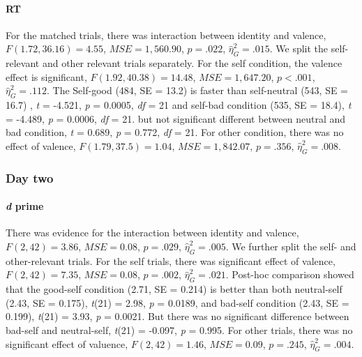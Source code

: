 \documentclass[man]{apa6}
\let\oldparagraph\paragraph
\renewcommand{\paragraph}[1]{\oldparagraph{#1}\mbox{}}
\begin{document}
\hypertarget{rt}{%
\paragraph{RT}\label{rt}}

For the matched trials, there was interaction between identity and valence, \(F(1.72, 36.16) = 4.55\), \(\mathit{MSE} = 1,560.90\), \(p = .022\), \(\hat{\eta}^2_G = .015\). We split the self-relevant and other relevant trials separately. For the self condition, the valence effect is significant, \(F(1.92, 40.38) = 14.48\), \(\mathit{MSE} = 1,647.20\), \(p < .001\), \(\hat{\eta}^2_G = .112\). The Self-good (484, SE = 13.2) is faster than self-neutral (543, SE = 16.7) , \emph{t} = -4.521, \emph{p} = 0.0005, \emph{df} = 21 and self-bad condition (535, SE = 18.4), \emph{t} = -4.489, \emph{p} = 0.0006, \emph{df} = 21. but not significant different between neutral and bad condition, \emph{t} = 0.689, \emph{p} = 0.772, \emph{df} = 21. For other condition, there was no effect of valence, \(F(1.79, 37.5) = 1.04\), \(\mathit{MSE} = 1,842.07\), \(p = .356\), \(\hat{\eta}^2_G = .008\).

\hypertarget{day-two}{%
\subsubsection{Day two}\label{day-two}}

\hypertarget{d-prime-4}{%
\paragraph{\texorpdfstring{\emph{d} prime}{d prime}}\label{d-prime-4}}

There was evidence for the interaction between identity and valence, \(F(2, 42) = 3.86\), \(\mathit{MSE} = 0.08\), \(p = .029\), \(\hat{\eta}^2_G = .005\). We further split the self- and other-relevant trials. For the self trials, there was significant effect of valence, \(F(2, 42) = 7.35\), \(\mathit{MSE} = 0.08\), \(p = .002\), \(\hat{\eta}^2_G = .021\). Post-hoc comparison showed that the good-self condition (2.71, SE = 0.214) is better than both neutral-self (2.43, SE = 0.175), \emph{t}(21) = 2.98, \emph{p} = 0.0189, and bad-self condition (2.43, SE = 0.199), \emph{t}(21) = 3.93, \emph{p} = 0.0021. But there was no significant difference between bad-self and neutral-self, \emph{t}(21) = -0.097, \emph{p} = 0.995. For other trials, there was no significant effect of valuence, \(F(2, 42) = 1.46\), \(\mathit{MSE} = 0.09\), \(p = .245\), \(\hat{\eta}^2_G = .004\).
\end{document}
